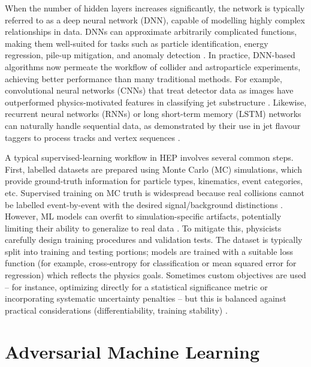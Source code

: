 When the number of hidden layers increases significantly, the network is typically referred to as a deep neural network (DNN), capable of modelling highly complex relationships in data. DNNs can approximate arbitrarily complicated functions, making them well-suited for tasks such as particle identification, energy regression, pile-up mitigation, and anomaly detection \cite{Khalaf:2025grv}. In practice, DNN-based algorithms now permeate the workflow of collider and astroparticle experiments, achieving better performance than many traditional methods. For example, convolutional neural networks (CNNs) that treat detector data as images have outperformed physics-motivated features in classifying jet substructure \cite{de_Oliveira_2016}. Likewise, recurrent neural networks (RNNs) or long short-term memory (LSTM) networks can naturally handle sequential data, as demonstrated by their use in jet flavour taggers to process tracks and vertex sequences \cite{Bols_2020}.

A typical supervised-learning workflow in HEP involves several common steps. First, labelled datasets are prepared using Monte Carlo (MC) simulations, which provide ground-truth information for particle types, kinematics, event categories, etc. Supervised training on MC truth is widespread because real collisions cannot be labelled event-by-event with the desired signal/background distinctions \cite{PhysRevD.112.016004}. However, ML models can overfit to simulation-specific artifacts, potentially limiting their ability to generalize to real data \cite{PhysRevD.112.016004}. To mitigate this, physicists carefully design training procedures and validation tests. The dataset is typically split into training and testing portions; models are trained with a suitable loss function (for example, cross-entropy for classification or mean squared error for regression) which reflects the physics goals. Sometimes custom objectives are used – for instance, optimizing directly for a statistical significance metric or incorporating systematic uncertainty penalties – but this is balanced against practical considerations (differentiability, training stability) \cite{Bardhan:2024ibw}.

\section{Adversarial Machine Learning}

